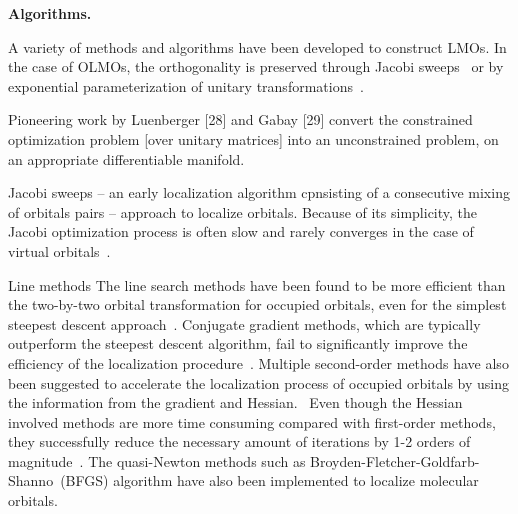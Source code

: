 \documentclass[aps,prl,reprint,amsmath,amssymb]{revtex4-1}
\begin{document}


\textbf{Algorithms.} 

A variety of methods and algorithms have been developed to construct LMOs. 
In the case of OLMOs, the orthogonality is preserved through Jacobi sweeps~\cite{edmiston1963localized, barr1975improved} or by exponential parameterization of unitary transformations~\cite{berghold2000general}. 

Pioneering work by Luenberger [28] and Gabay [29] convert the constrained optimization problem [over unitary matrices] into an unconstrained problem, on an appropriate differentiable manifold.

%
%
Jacobi sweeps -- an early localization algorithm cpnsisting of a consecutive mixing of orbitals pairs -- approach to localize orbitals. Because of its simplicity, the Jacobi optimization process is often slow and rarely converges in the case of virtual orbitals~\cite{RZK-citation-is-needed,subotnik?}. 



Line methods 
The line search methods have been found to be more efficient than the two-by-two orbital transformation for occupied orbitals, even for the simplest steepest descent approach~\cite{edmiston1965localized}.
Conjugate gradient methods, which are typically outperform the steepest descent algorithm, fail to significantly improve the efficiency of the localization procedure~\cite{ryback1978application}.
Multiple second-order methods have also been suggested to accelerate the localization process of occupied orbitals by using the information from the gradient and Hessian.~\cite{leonard1982quadratically, kari1984parametrization}
Even though the Hessian involved methods are more time consuming compared with first-order methods, they successfully reduce the necessary amount of iterations by 1-2 orders of magnitude~\citet{leonard1982quadratically}.
The quasi-Newton methods such as Broyden-Fletcher-Goldfarb-Shanno~(BFGS) algorithm have also been implemented to localize molecular orbitals.~\cite{kari1984parametrization}
\end{document}
